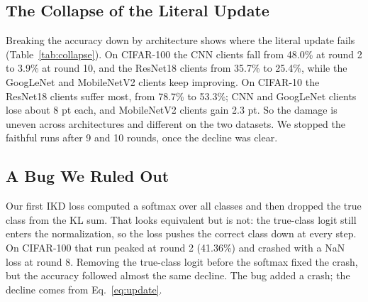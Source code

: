 \documentclass[conference]{IEEEtran}
\begin{document}
\subsection{The Collapse of the Literal Update}
\label{sec:collapse}
Breaking the accuracy down by architecture shows where the literal update fails (Table~\ref{tab:collapse}). On CIFAR-100 the CNN clients fall from 48.0\% at round 2 to 3.9\% at round 10, and the ResNet18 clients from 35.7\% to 25.4\%, while the GoogLeNet and MobileNetV2 clients keep improving. On CIFAR-10 the ResNet18 clients suffer most, from 78.7\% to 53.3\%; CNN and GoogLeNet clients lose about 8 pt each, and MobileNetV2 clients gain 2.3 pt. So the damage is uneven across architectures and different on the two datasets. We stopped the faithful runs after 9 and 10 rounds, once the decline was clear.

\begin{table}[t]
\centering
\caption{Mean test accuracy (\%) of the five clients of each architecture: faithful Fed-GDBD at its best and last rounds, and FedGDBD-S at round 50.}
\label{tab:collapse}
\footnotesize
\setlength{\tabcolsep}{2.6pt}
\resizebox{\columnwidth}{!}{\TabCollapse}
\end{table}

\subsection{A Bug We Ruled Out}
Our first IKD loss computed a softmax over all classes and then dropped the true class from the KL sum. That looks equivalent but is not: the true-class logit still enters the normalization, so the loss pushes the correct class down at every step. On CIFAR-100 that run peaked at round 2 (41.36\%) and crashed with a NaN loss at round 8. Removing the true-class logit before the softmax fixed the crash, but the accuracy followed almost the same decline. The bug added a crash; the decline comes from Eq.~\eqref{eq:update}.
\end{document}
